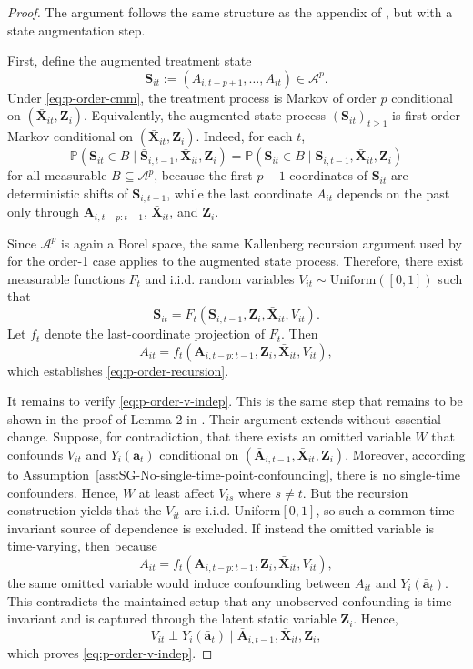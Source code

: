 \begin{proof}
The argument follows the same structure as the appendix of , but
with a state augmentation step.

First, define the augmented treatment state
\[
\mathbf{S}_{it} := (A_{i,t-p+1},\dots, A_{it}) \in \mathcal A^p.
\]
Under \eqref{eq:p-order-cmm}, the treatment process is Markov of order \(p\) conditional on
\((\bar{\mathbf{X}}_{it},\mathbf{Z}_i)\). Equivalently, the augmented state process \((\mathbf{S}_{it})_{t\ge1}\) is first-order
Markov conditional on \((\bar{\mathbf{X}}_{it},\mathbf{Z}_i)\). Indeed, for each \(t\),
\[
\mathbb{P}(\mathbf{S}_{it} \in B \mid \bar{\mathbf{S}}_{i,t-1}, \bar{\mathbf{X}}_{it}, \mathbf{Z}_i)
=
\mathbb{P}(\mathbf{S}_{it} \in B \mid \mathbf{S}_{i,t-1}, \bar{\mathbf{X}}_{it}, \mathbf{Z}_i)
\]
for all measurable \(B \subseteq \mathcal A^p\), because the first \(p-1\) coordinates of
\(\mathbf{S}_{it}\) are deterministic shifts of \(\mathbf{S}_{i,t-1}\), while the last coordinate \(A_{it}\) depends
on the past only through \(\mathbf{A}_{i,t-p:t-1}\), \(\bar{\mathbf{X}}_{it}\), and \(\mathbf{Z}_i\).

Since \(\mathcal A^p\) is again a Borel space, the same Kallenberg recursion argument used by
 for the order-1 case applies to the augmented state process.
Therefore, there exist measurable functions \(F_t\) and i.i.d. random variables
\(V_{it} \sim \mathrm{Uniform}([0,1])\) such that
\[
\mathbf{S}_{it} = F_t(\mathbf{S}_{i,t-1}, \mathbf{Z}_i, \bar{\mathbf{X}}_{it}, V_{it}).
\]
Let \(f_t\) denote the last-coordinate projection of \(F_t\). Then
\[
A_{it} = f_t(\mathbf{A}_{i,t-p:t-1}, \mathbf{Z}_i, \bar{\mathbf{X}}_{it}, V_{it}),
\]
which establishes \eqref{eq:p-order-recursion}.

It remains to verify \eqref{eq:p-order-v-indep}. This is the same step that remains to be shown
in the proof of Lemma 2 in . Their argument extends without essential
change. Suppose, for contradiction, that there exists an omitted variable $W$ that confounds
\(V_{it}\) and \(Y_i(\bar{\mathbf{a}}_t)\) conditional on \((\bar{\mathbf{A}}_{i,t-1},\bar{\mathbf{X}}_{it},\mathbf{Z}_i)\). 
Moreover, according to Assumption~\ref{ass:SG-No-single-time-point-confounding}, there is no 
single-time confounders. Hence, $W$ at least affect $V_{is}$ where $s \neq t$. 
But the recursion construction yields that the \(V_{it}\) are i.i.d. Uniform\([0,1]\),
so such a common time-invariant source of dependence is excluded. 
If instead the omitted variable is time-varying, then because
\[
A_{it} = f_t(\mathbf{A}_{i,t-p:t-1}, \mathbf{Z}_i, \bar{\mathbf{X}}_{it}, V_{it}),
\]
the same omitted variable would induce confounding between \(A_{it}\) and \(Y_i(\bar{\mathbf{a}}_t)\).
This contradicts the maintained setup that any unobserved confounding is time-invariant and is
captured through the latent static variable \(\mathbf{Z}_i\). Hence,
\[
V_{it} \perp Y_i(\bar{\mathbf{a}}_t)\mid \bar{\mathbf{A}}_{i,t-1},\bar{\mathbf{X}}_{it},\mathbf{Z}_i,
\]
which proves \eqref{eq:p-order-v-indep}.


\end{proof}
